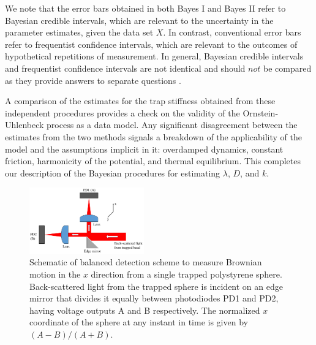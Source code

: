 \documentclass[english,aps, onecolumn, prl,superscriptaddress, notitlepage]{revtex4-1}
\begin{document}
We note that the error bars obtained in both Bayes I and Bayes II
refer to Bayesian credible intervals, which are relevant to the uncertainty
in the parameter estimates, given the data set $X$. In contrast,
conventional error bars refer to frequentist confidence intervals,
which are relevant to the outcomes of hypothetical repetitions of
measurement. In general, Bayesian credible intervals and frequentist
confidence intervals are not identical and should $not$ be compared
as they provide answers to separate questions \cite{jaynes1976confidence}. 

A comparison of the estimates for the trap stiffness obtained from
these independent procedures provides a check on the validity of the
Ornstein-Uhlenbeck process as a data model. Any significant disagreement
between the estimates from the two methods signals a breakdown of
the applicability of the model and the assumptions implicit in it:
overdamped dynamics, constant friction, harmonicity of the potential,
and thermal equilibrium. This completes our description of the Bayesian
procedures for estimating $\lambda$, $D$, and $k$. 
\begin{figure}[t!]
\centering
\includegraphics[width=0.44\textwidth]{figure1.jpg}
\caption{Schematic of balanced detection scheme to measure Brownian motion
in the $x$ direction from a single trapped polystyrene sphere. Back-scattered
light from the trapped sphere is incident on an edge mirror that divides
it equally between photodiodes PD1 and PD2, having voltage outputs
A and B respectively. The normalized $x$ coordinate of the sphere
at any instant in time is given by $(A-B)/(A+B).$\label{fig:balanced-detection}}
\end{figure}
\end{document}
